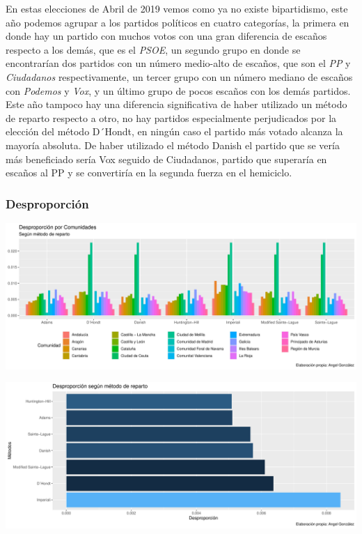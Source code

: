 \documentclass[12pt,a4paper,]{book}
\numberwithin{dummy}{section}
\theoremstyle{ocrenumbox}
\theoremstyle{blacknumex}
\theoremstyle{blacknumbox}
\theoremstyle{ocrenum}
\theoremstyle{ocrenum}
\begin{document}
En estas elecciones de Abril de 2019 vemos como ya no existe
bipartidismo, este año podemos agrupar a los partidos políticos en
cuatro categorías, la primera en donde hay un partido con muchos votos
con una gran diferencia de escaños respecto a los demás, que es el
\emph{PSOE}, un segundo grupo en donde se encontrarían dos partidos con
un número medio-alto de escaños, que son el \emph{PP} y
\emph{Ciudadanos} respectivamente, un tercer grupo con un número mediano
de escaños con \emph{Podemos} y \emph{Vox}, y un último grupo de pocos
escaños con los demás partidos. Este año tampoco hay una diferencia
significativa de haber utilizado un método de reparto respecto a otro,
no hay partidos especialmente perjudicados por la elección del método
D´Hondt, en ningún caso el partido más votado alcanza la mayoría
absoluta. De haber utilizado el método Danish el partido que se vería
más beneficiado sería Vox seguido de Ciudadanos, partido que superaría
en escaños al PP y se convertiría en la segunda fuerza en el hemiciclo.

\hypertarget{desproporciuxf3n-13}{%
\subsubsection{Desproporción}\label{desproporciuxf3n-13}}

\begin{center}\includegraphics[width=0.95\linewidth]{figurasR/unnamed-chunk-180-1} \end{center}

\begin{center}\includegraphics[width=0.95\linewidth]{figurasR/unnamed-chunk-180-2} \end{center}
\end{document}
